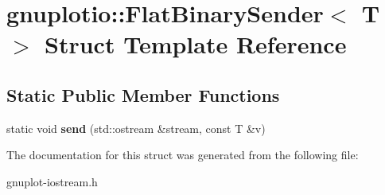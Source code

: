 \hypertarget{structgnuplotio_1_1FlatBinarySender}{}\section{gnuplotio\+:\+:Flat\+Binary\+Sender$<$ T $>$ Struct Template Reference}
\label{structgnuplotio_1_1FlatBinarySender}
\subsection*{Static Public Member Functions}
\begin{DoxyCompactItemize}
\item 
\mbox{\label{structgnuplotio_1_1FlatBinarySender_a24d085492f2539c14033cd5c6ba75ba5}} 
static void {\bfseries send} (std\+::ostream \&stream, const T \&v)
\end{DoxyCompactItemize}


The documentation for this struct was generated from the following file\+:\begin{DoxyCompactItemize}
\item 
gnuplot-\/iostream.\+h\end{DoxyCompactItemize}
